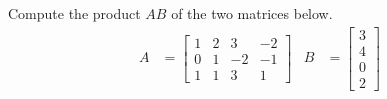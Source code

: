 Compute the product  $AB$ of the two matrices below.
%
\begin{align*}
A&=
\begin{bmatrix}
1 & 2 & 3 & -2 \\ 0 & 1 & -2 & -1\\ 1 & 1 & 3 & 1
\end{bmatrix}
&
B&=
\begin{bmatrix}
3\\ 4 \\ 0 \\ 2
\end{bmatrix}
\end{align*}
